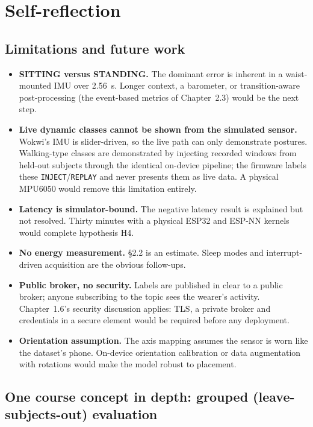 \documentclass[10pt,a4paper]{article}
\begin{document}
\section{Self-reflection}

\subsection{Limitations and future work}
\begin{itemize}
  \item \textbf{SITTING versus STANDING.} The dominant error is inherent in a waist-mounted IMU over \SI{2.56}{s}. Longer context, a barometer, or transition-aware post-processing (the event-based metrics of Chapter~2.3) would be the next step.
  \item \textbf{Live dynamic classes cannot be shown from the simulated sensor.} Wokwi's IMU is slider-driven, so the live path can only demonstrate postures. Walking-type classes are demonstrated by injecting recorded windows from held-out subjects through the identical on-device pipeline; the firmware labels these \texttt{INJECT}/\texttt{REPLAY} and never presents them as live data. A physical MPU6050 would remove this limitation entirely.
  \item \textbf{Latency is simulator-bound.} The negative latency result is explained but not resolved. Thirty minutes with a physical ESP32 and ESP-NN kernels would complete hypothesis H4.
  \item \textbf{No energy measurement.} \S2.2 is an estimate. Sleep modes and interrupt-driven acquisition are the obvious follow-ups.
  \item \textbf{Public broker, no security.} Labels are published in clear to a public broker; anyone subscribing to the topic sees the wearer's activity. Chapter~1.6's security discussion applies: TLS, a private broker and credentials in a secure element would be required before any deployment.
  \item \textbf{Orientation assumption.} The axis mapping assumes the sensor is worn like the dataset's phone. On-device orientation calibration or data augmentation with rotations would make the model robust to placement.
\end{itemize}

\subsection{One course concept in depth: grouped (leave-subjects-out) evaluation}
\end{document}
